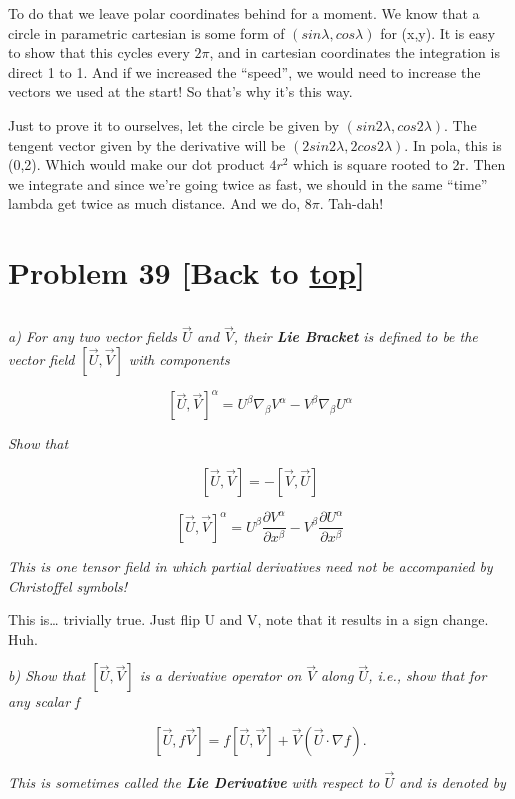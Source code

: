 \documentclass[landscape,letterpaper,10pt,english]{article}
\begin{document}
To do that we leave polar coordinates behind for a moment. We know that
a circle in parametric cartesian is some form of
\((sin\lambda,cos\lambda)\) for (x,y). It is easy to show that this
cycles every \(2\pi\), and in cartesian coordinates the integration is
direct 1 to 1. And if we increased the ``speed'', we would need to
increase the vectors we used at the start! So that's why it's this way.

Just to prove it to ourselves, let the circle be given by
\((sin2\lambda,cos2\lambda)\). The tengent vector given by the
derivative will be \((2sin2\lambda,2cos2\lambda)\). In pola, this is
(0,2). Which would make our dot product \(4r^2\) which is square rooted
to 2r. Then we integrate and since we're going twice as fast, we should
in the same ``time'' lambda get twice as much distance. And we do,
\(8\pi\). Tah-dah!

    \hypertarget{problem-39-back-to-top}{%
\section{\texorpdfstring{Problem 39 {[}Back to
\hyperref[toc]{top}{]}}{Problem 39 {[}Back to {]}}}\label{problem-39-back-to-top}}

\[\label{P39}\]

\emph{a) For any two vector fields \(\vec U\) and \(\vec V\), their
\textbf{Lie Bracket} is defined to be the vector field
\([\vec U, \vec V]\) with components}

\[ [\vec U, \vec V]^\alpha = U^\beta \nabla_\beta V^\alpha - V^\beta \nabla_\beta U^\alpha \]

\emph{Show that}

\[ [\vec U, \vec V] = -[\vec V, \vec U] \]

\[ [\vec U, \vec V]^\alpha = U^\beta \frac{\partial V^\alpha}{\partial x^\beta} - V^\beta \frac{\partial U^\alpha}{\partial x^\beta} \]

\emph{This is one tensor field in which partial derivatives need not be
accompanied by Christoffel symbols!}

    This is\ldots{} trivially true. Just flip U and V, note that it results
in a sign change. Huh.

    \emph{b) Show that \([\vec U, \vec V]\) is a derivative operator on
\(\vec V\) along \(\vec U\), i.e., show that for any scalar f}

\[ [\vec U, f\vec V] = f[\vec U, \vec V] + \vec V(\vec U \cdot \nabla f). \]

\emph{This is sometimes called the \textbf{Lie Derivative} with respect
to \(\vec U\) and is denoted by}
\end{document}
